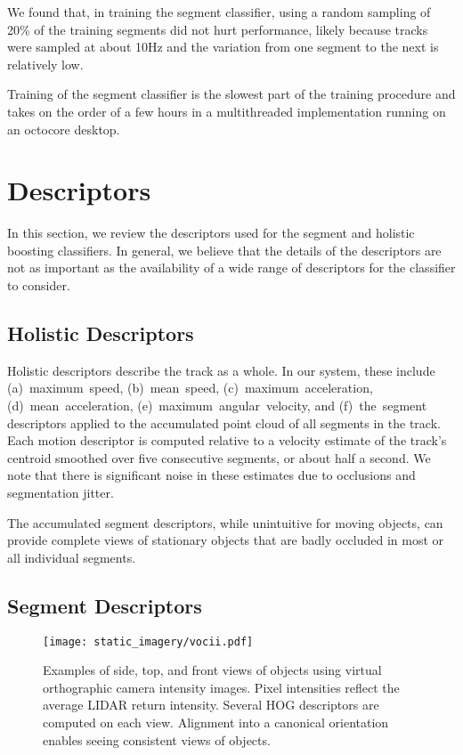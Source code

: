 \documentclass[letterpaper, 10 pt, conference]{ieeeconf}  %
\begin{document}
We found that, in training the segment classifier, using a random sampling of 20\% of the training segments did not hurt performance, likely because tracks were sampled at about 10Hz and the variation from one segment to the next is relatively low.

Training of the segment classifier is the slowest part of the training procedure and takes on the order of a few hours in a multithreaded implementation running on an octocore desktop.


\section{Descriptors}
\label{sec:descriptors}

In this section, we review the descriptors used for the segment and holistic boosting classifiers.  In general, we believe that the details of the descriptors are not as important as the availability of a wide range of descriptors for the classifier to consider.



\subsection{Holistic Descriptors}

Holistic descriptors describe the track as a whole.  In our system, these include (a)~maximum~speed, (b)~mean~speed, (c)~maximum~acceleration, (d)~mean~acceleration, (e)~maximum~angular~velocity, and (f)~the~segment descriptors applied to the accumulated point cloud of all segments in the track.  Each motion descriptor is computed relative to a velocity estimate of the track's centroid smoothed over five consecutive segments, or about half a second.  We note that there is significant noise in these estimates due to  occlusions and segmentation jitter.

The accumulated segment descriptors, while unintuitive for moving objects, can provide complete views of stationary objects that are badly occluded in most or all individual segments.

\subsection{Segment Descriptors}


\begin{figure}
  \centering
  \texttt{[image: static\_imagery/vocii.pdf]}
  \caption{Examples of side, top, and front views of objects using virtual orthographic camera intensity images.  Pixel intensities reflect the average LIDAR return intensity.  Several HOG descriptors are computed on each view.  Alignment into a canonical orientation enables seeing consistent views of objects.}
  \label{fig:descriptors}
\end{figure}
\end{document}
